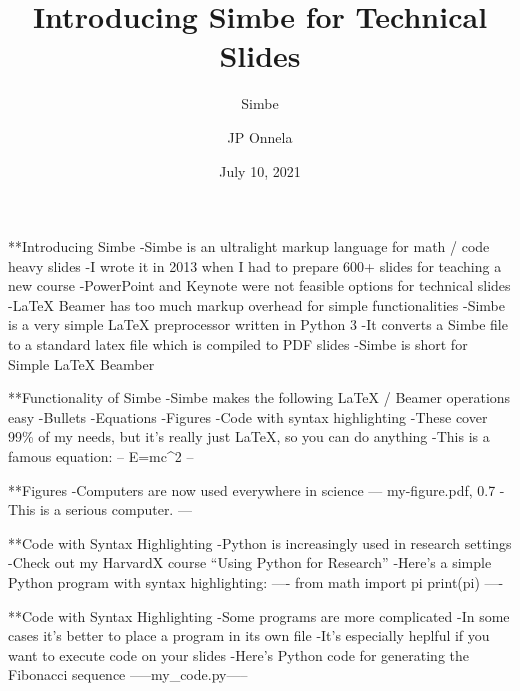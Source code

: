 
\title[Simbe]{Introducing Simbe for Technical Slides}
\subtitle{Simbe}
\author[JP Onnela]{JP Onnela}
\date[July 10, 2021]{July 10, 2021}
\frame{\titlepage}

**Introducing Simbe
-Simbe is an ultralight markup language for math / code heavy slides
-I wrote it in 2013 when I had to prepare 600+ slides for teaching a new course
-PowerPoint and Keynote were not feasible options for technical slides
-LaTeX Beamer has too much markup overhead for simple functionalities
-Simbe is a very simple LaTeX preprocessor written in Python 3
-It converts a Simbe file to a standard latex file which is compiled to PDF slides
-Simbe is short for Simple LaTeX Beamber

**Functionality of Simbe
-Simbe makes the following LaTeX / Beamer operations easy
    -Bullets
    -Equations
    -Figures
    -Code with syntax highlighting
-These cover 99\% of my needs, but it's really just LaTeX, so you can do anything
-This is a famous equation:
--
E=mc^2
--

**Figures
-Computers are now used everywhere in science
---
my-figure.pdf, 0.7
-This is a serious computer.
---

**Code with Syntax Highlighting
-Python is increasingly used in research settings
-Check out my HarvardX course ``Using Python for Research''
-Here's a simple Python program with syntax highlighting:
----
from math import pi
print(pi)
----

**Code with Syntax Highlighting
-Some programs are more complicated
-In some cases it's better to place a program in its own file
-It's especially heplful if you want to execute code on your slides
-Here's Python code for generating the Fibonacci sequence
-----my_code.py-----

